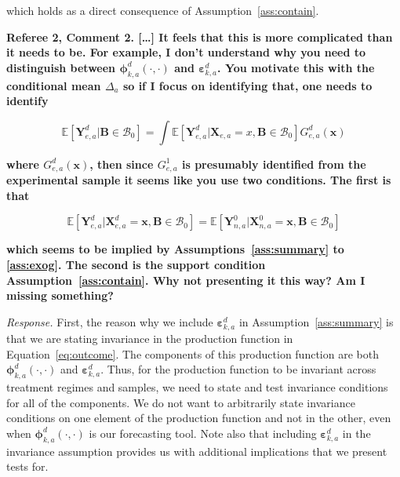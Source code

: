 which holds as a direct consequence of Assumption~\ref{ass:contain}.

\noindent \textbf{Referee 2, Comment 2. [\ldots] It feels that this is more complicated than it needs to be. For example, I don't understand why you need to distinguish between $\bm{\phi}_{k,a}^d \left( \cdot, \cdot \right) $ and $\bm{\varepsilon}_{k,a}^d$. You motivate this with the conditional mean $\Delta_a$ so if I focus on identifying that, one needs to identify}

\begin{equation}
\mathbb{E} \left[ \bm{Y}_{e,a}^d | \bm{B} \in \mathcal{B}_0 \right] = \int \mathbb{E} \left[ \bm{Y}_{e,a}^d | \bm{X}_{e,a} = x, \bm{B} \in \mathcal{B}_0 \right] G_{e,a}^d \left( \bm{x} \right)
\end{equation}

\textbf{where $G_{e,a}^d \left( \bm{x} \right)$, then since $G_{e,a}^1$ is presumably identified from the experimental sample it seems like you use two conditions. The first is that}

\begin{equation}
\mathbb{E} \left[  \bm{Y}_{e,a}^d | \bm{X}_{e,a}^d = \bm{x},  \bm{B} \in \mathcal{B}_0 \right] = \mathbb{E} \left[  \bm{Y}_{n,a}^0 | \bm{X}_{n,a}^0 = \bm{x},  \bm{B} \in \mathcal{B}_0 \right]  \label{eq:ref4}
\end{equation}

\textbf{which seems to be implied by Assumptions~\ref{ass:summary} to \ref{ass:exog}. The second is the support condition Assumption~\ref{ass:contain}. Why not presenting it this way? Am I missing something?}

\noindent \textit{Response.} First, the reason why we include $\bm{\varepsilon}_{k,a}^d$ in Assumption~\ref{ass:summary} is that we are stating invariance in the production function in Equation~\eqref{eq:outcome}. The components of this production function are both $\bm{\phi}_{k,a}^d \left( \cdot, \cdot \right) $ and $\bm{\varepsilon}_{k,a}^d$. Thus, for the production function to be invariant across treatment regimes and samples, we need to state and test invariance conditions for all of the components. We do not want to arbitrarily state invariance conditions on one element of the production function and not in the other, even when $\bm{\phi}_{k,a}^d \left( \cdot, \cdot \right) $ is our forecasting tool. Note also that including $\bm{\varepsilon}_{k,a}^d$ in the invariance assumption provides us with additional implications that we present tests for.

